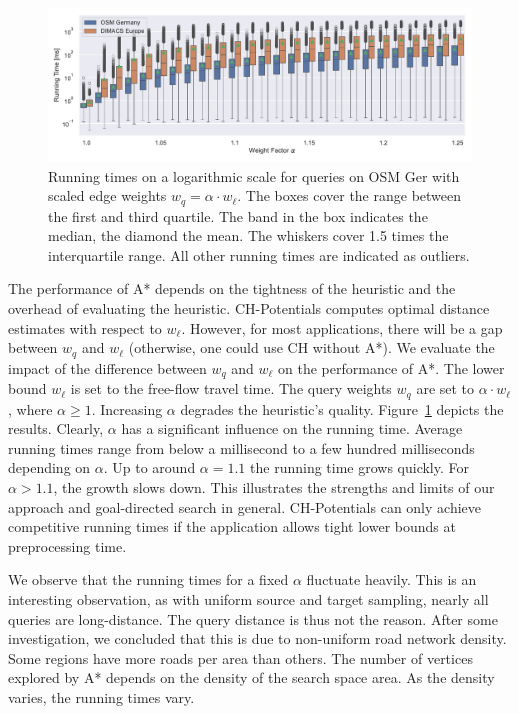 \documentclass[manuscript,review]{acmart}
\begin{document}
\begin{figure}
\centering
\includegraphics[width=\linewidth]{fig/scaled_weights.pdf}
\caption{
Running times on a logarithmic scale for queries on OSM Ger with scaled edge weights $w_q = \alpha \cdot w_\ell$.
The boxes cover the range between the first and third quartile.
The band in the box indicates the median, the diamond the mean.
The whiskers cover 1.5 times the interquartile range.
All other running times are indicated as outliers.
}\label{fig:scaled_weights}
\end{figure}

The performance of A* depends on the tightness of the heuristic and the overhead of evaluating the heuristic.
CH-Potentials computes optimal distance estimates with respect to $w_\ell$.
However, for most applications, there will be a gap between $w_q$ and $w_\ell$ (otherwise, one could use CH without A*).
We evaluate the impact of the difference between $w_q$ and $w_\ell$ on the performance of A*.
The lower bound $w_\ell$ is set to the free-flow travel time.
The query weights $w_q$ are set to $\alpha \cdot w_\ell$, where $\alpha\ge 1$.
Increasing $\alpha$ degrades the heuristic's quality.
Figure~\ref{fig:scaled_weights} depicts the results.
Clearly, $\alpha$ has a significant influence on the running time.
Average running times range from below a millisecond to a few hundred milliseconds depending on $\alpha$.
Up to around $\alpha = 1.1$ the running time grows quickly.
For $\alpha > 1.1$, the growth slows down.
This illustrates the strengths and limits of our approach and goal-directed search in general.
CH-Potentials can only achieve competitive running times if the application allows tight lower bounds at preprocessing time.

We observe that the running times for a fixed $\alpha$ fluctuate heavily.
This is an interesting observation, as with uniform source and target sampling, nearly all queries are long-distance.
The query distance is thus not the reason.
After some investigation, we concluded that this is due to non-uniform road network density.
Some regions have more roads per area than others.
The number of vertices explored by A* depends on the density of the search space area.
As the density varies, the running times vary.
\end{document}

